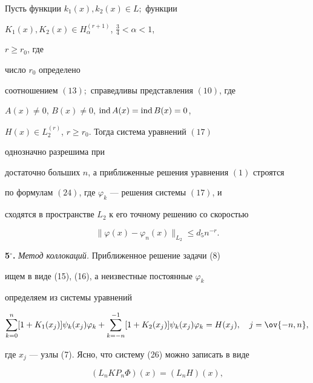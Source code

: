 \begin{thm} 


Пусть функции $k_1(x),k_2(x)\in L;$ функции 


$K_1(x),K_2(x)\in H^{(r+1)}_\alpha$, $\frac{3}{4}<\alpha< 1$, 


$r\ge r_0$, где 


число $r_0$ определено 


соотношением $(13);$ справедливы представления $(10)$, где 


$A(x)\ne 0$, $B(x)\ne 0$, $\operatorname{ind} A(x)=\operatorname{ind} B(x)=0$, 


$H(x)\in L^{(r)}_2$, $r\ge r_0$. Тогда система уравнений $(17)$ 


однозначно разрешима при 


достаточно больших $n$, а приближенные решения уравнения $(1)$ строятся 


по формулам $(24)$, где $\varphi_k$ --- решения системы $(17)$, и 


сходятся в пространстве $L_2$ к его точному решению со скоростью 


\begin{equation} 


\|\varphi(x)-\varphi_n(x)\|_{L_2}\le d_5n^{-r}. 


\end{equation} 


\end{thm} 


 


{\bf 5${}^\circ$.} {\it Метод коллокаций.} Приближенное решение задачи (8) 


ищем в виде (15), (16), а неизвестные постоянные $\varphi_k$ 


определяем из системы уравнений 


\begin{equation} 


\sum^n_{k=0}[1+K_1(x_j)]\psi_k(x_j)\varphi_k+ 


\sum^{-1}_{k=-n}[1+K_2(x_j)]\psi_k(x_j)\varphi_k=H(x_j), 


\quad j=\ov{-n,n}, 


\end{equation} 


где $x_j$ --- узлы (7). Ясно, что систему (26) можно записать в виде 


$$ 


(L_n K P_n\Phi)(x)=(L_n H)(x), 


$$ 


